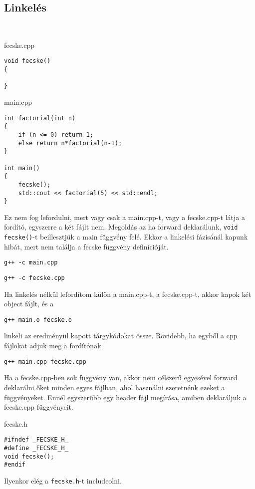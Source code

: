 \documentclass[a4paper,11.5pt]{article}
\begin{document}
	\subsection{Linkelés}
	\begin{example}\ 
		
		fecske.cpp
		\begin{lstlisting}
void fecske()
{

}
		\end{lstlisting}
		
		main.cpp
		\begin{lstlisting}
int factorial(int n)
{
	if (n <= 0) return 1;
	else return n*factorial(n-1);
}

int main()
{
	fecske();
	std::cout << factorial(5) << std::endl;
}
		\end{lstlisting}
		
		Ez nem fog lefordulni, mert vagy csak a main.cpp-t, vagy a fecske.cpp-t látja a fordító, egyszerre a két fájlt nem. Megoldás az ha forward deklarálunk, \texttt{void fecske()}-t beillesztjük a main függvény felé. Ekkor a linkelési fázisánál kapunk hibát, mert nem találja a fecske függvény definícióját.
		
    \texttt{g++ -c main.cpp}

		\texttt{g++ -c fecske.cpp}

		Ha linkelés nélkül lefordítom külön a main.cpp-t, a fecske.cpp-t, akkor kapok két object fájlt, és a
		
		\texttt{g++ main.o fecske.o}
		
    linkeli az eredményül kapott tárgykódokat össze. Rövidebb, ha egyből a cpp fájlokat adjuk meg a fordítónak.

		\texttt{g++ main.cpp fecske.cpp}
	\end{example}
	Ha a fecske.cpp-ben sok függvény van, akkor nem célszerű egyesével forward deklarálni őket minden egyes fájlban, ahol használni szeretnénk ezeket a függvényeket. Ennél egyszerűbb egy header fájl megírása, amiben deklaráljuk a fecske.cpp függvényeit.
	
	fecske.h
	\begin{lstlisting}
#ifndef _FECSKE_H_
#define _FECSKE_H_
void fecske();
#endif
	\end{lstlisting}
	Ilyenkor elég a \texttt{fecske.h}-t includeolni.
	
\end{document}
